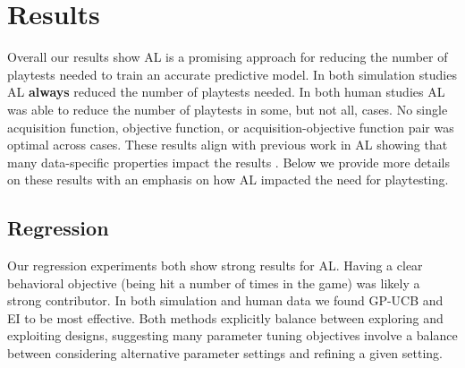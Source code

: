 \documentclass{sig-alternate}
\begin{document}

\section{Results}

Overall our results show AL is a promising approach for reducing the number of playtests needed to train an accurate predictive model.
In both simulation studies AL \textbf{always} reduced the number of playtests needed. %
In both human studies AL was able to reduce the number of playtests in some, but not all, cases.
No single acquisition function, objective function, or acquisition-objective function pair was optimal across cases.
These results align with previous work in AL showing that many data-specific properties impact the results \cite{schein2007:al-logreg-eval}.
Below we provide more details on these results with an emphasis on how AL impacted the need for playtesting.


\subsection{Regression}

Our regression experiments both show strong results for AL.
Having a clear behavioral objective (being hit a number of times in the game) was likely a strong contributor.
In both simulation and human data we found GP-UCB and EI to be most effective.
Both methods explicitly balance between exploring and exploiting designs, suggesting many parameter tuning objectives involve a balance between considering alternative parameter settings and refining a given setting.
\end{document}
